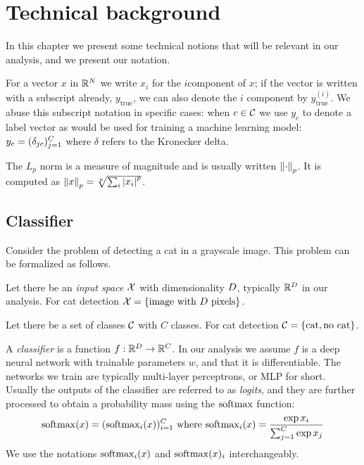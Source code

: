 \documentclass[../main.tex]{subfiles}
\begin{document}
\chapter{Technical background}
\label{ch:background}

In this chapter we present some technical notions that will be relevant in our analysis, and we present our notation.

For a vector $x$ in $\mathbb{R}^N$ we write $x_i$ for the $i$\nth component of $x$; if the vector is written with a subscript already, \eg{} $y_\text{true}$, we can also denote the $i$\nth{} component by $y^{(i)}_\text{true}$.
We abuse this subscript notation in specific cases:
when $c \in \mathcal{C}$ we use $y_c$ to denote a label vector as would be used for training a machine learning model: $y_c = (\delta_{jc})_{j=1}^{C}$ where $\delta$ refers to the Kronecker delta.

The $L_p$ norm is a measure of magnitude and is usually written $\left\lVert\cdot\right\rVert_p$.
It is computed as $\left\lVert x\right\rVert_p = \sqrt[p]{\sum_i \left\lvert x_i\right\rvert^p}$.

\section{Classifier}

Consider the problem of detecting a cat in a grayscale image. This problem can be formalized as follows.

Let there be an \emph{input space} $\mathcal{X}$ with dimensionality $D$, typically $\mathbb{R}^D$ in our analysis. For cat detection $\mathcal{X} = \{\text{image with $D$ pixels}\}$.

Let there be a set of classes $\mathcal{C}$ with $C$ classes. For cat detection $\mathcal{C} = \{\text{cat}, \text{no cat}\}$.

A \emph{classifier} is a function $f: \mathbb{R}^D \to \mathbb{R}^C$. In our analysis we assume $f$ is a deep neural network with trainable parameters $w$, and that it is differentiable. The networks we train are typically multi-layer perceptrons, or MLP for short.
Usually the outputs of the classifier are referred to as \emph{logits}, and they are further processed to obtain a probability mass using the $\mathrm{softmax}$ function:
\begin{equation}
    \mathrm{softmax}(x) = (\mathrm{softmax}_i(x))_{i=1}^{C} \text{ where }
    \mathrm{softmax}_i(x) = \frac{\exp x_i}{\sum_{j=1}^{C} \exp x_j}
\end{equation}
We use the notations $\mathrm{softmax}_i(x)$ and $\mathrm{softmax}(x)_i$ interchangeably.
\end{document}
